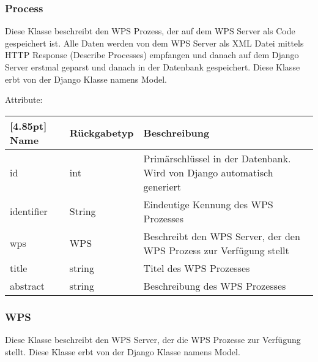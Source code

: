 \newpage

		\subsubsection{Process}
			Diese Klasse beschreibt den WPS Prozess, der auf dem WPS Server als Code gespeichert ist. Alle Daten werden von dem WPS Server als XML Datei mittels HTTP Response (Describe Processes) empfangen und danach auf dem Django Server erstmal geparst und danach in der Datenbank gespeichert. \newline
			Diese Klasse erbt von der Django Klasse namens \glqq Model\grqq .\newline
			
			Attribute:
			\begin{center}
				\setlength\tabcolsep{5pt}
				\renewcommand{\arraystretch}{1.5}
				
				\begin{tabularx}{\textwidth}{|l|l|X|}
					\hline
					\rowcolor[gray]{0.75}[4.85pt]
					Name & Rückgabetyp & Beschreibung \\ \hline 
					id & int & Primärschlüssel in der Datenbank. Wird von Django automatisch generiert \\ \hline
					identifier & String & Eindeutige Kennung des WPS Prozesses \\ \hline
					wps & WPS & Beschreibt den WPS Server, der den WPS Prozess zur Verfügung stellt \\ \hline
					title & string & Titel des WPS Prozesses \\ \hline
					abstract & string & Beschreibung des WPS Prozesses\\
					\hline
				\end{tabularx}
			\end{center}
		\subsubsection{WPS}
			Diese Klasse beschreibt den WPS Server, der die WPS Prozesse zur Verfügung stellt. \newline
			Diese Klasse erbt von der Django Klasse namens \glqq Model\grqq .\newline
			
